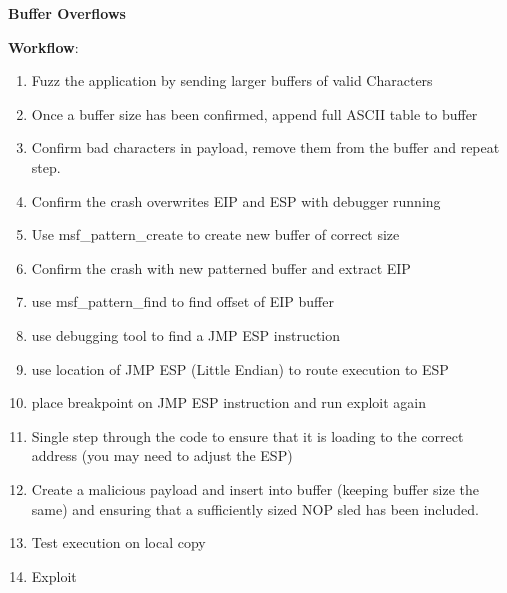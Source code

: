 \documentclass[a4paper,10pt]{article}
\begin{document}
\newpage
\Huge{\textbf{Buffer Overflows}}
\newline
\normalsize
\begin{tcolorbox}
\textbf{Workflow}:
\begin{enumerate}
	\itemsep0em 
	\item Fuzz the application by sending larger buffers of valid Characters
	\item Once a buffer size has been confirmed, append full ASCII table to buffer
	\item Confirm bad characters in payload, remove them from the buffer and repeat step.
	\item Confirm the crash overwrites EIP and ESP with debugger running
	\item Use msf\_pattern\_create to create new buffer of correct size
	\item Confirm the crash with new patterned buffer and extract EIP
	\item use msf\_pattern\_find to find offset of EIP buffer
	\item use debugging tool to find a JMP ESP instruction
	\item use location of JMP ESP (Little Endian) to route execution to ESP
	\item place breakpoint on JMP ESP instruction and run exploit again
	\item Single step through the code to ensure that it is loading to the correct address (you may need to adjust the ESP)
	\item Create a malicious payload and insert into buffer (keeping buffer size the same) and ensuring that a sufficiently sized NOP sled has been included.
	\item Test execution on local copy
	\item Exploit
\end{enumerate}
\end{tcolorbox}
\end{document}
